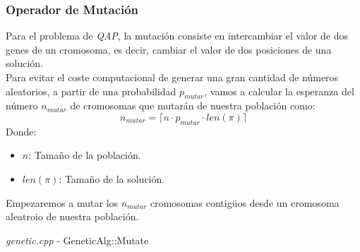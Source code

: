 \documentclass[a4paper, 12pt]{article}
\begin{document}
      \newpage
      \subsubsection*{Operador de Mutación}    
      Para el problema de \textit{QAP}, la mutación consiste en intercambiar el valor de dos genes de un cromosoma, es decir, cambiar el valor de dos posiciones de una solución.\\
      
      Para evitar el coste computacional de generar una gran cantidad de números aleatorios, a partir de una probabilidad $p_{mutar}$, vamos a calcular la esperanza del número $n_{mutar}$ de cromosomas que mutarán de nuestra población como:
      $$n_{mutar} = \lceil  n \cdot p_{mutar} \cdot len(\pi) \rceil$$
      Donde:
      \begin{itemize}
      	\item $n$: Tamaño de la población.
      	\item $len(\pi)$: Tamaño de la solución.
      \end{itemize}
      
      Empezaremos a mutar los $n_{mutar}$ cromosomas contigüos desde un cromosoma aleatroio de nuestra población.
      \begin{algorithm}
       	\caption{\textit{genetic.cpp} - GeneticAlg::Mutate}
       	
         \Def{Mutate($P$)}{
         	$P' = P$\\
         	$n_{mutar} = \lceil  n \cdot p_{mutar} \cdot len(P_0) \rceil$\\
         	$i = $ random in $[0, n)$\\
            \For{$j = 1$ \KwTo $n_{mutar}$}{
            	$r1 = $ random in $[0, len(P'_0))$\\
            	$r2 = $ random in $[0, len(P'_0))$\\
            	
            	\If{coste $P_i$ desconocido}{
            		Calcula coste $P_i$\\
            		evaluaciones++\\
            	}
            	
            	$\pi_o = P'_i$\\
            	$t = P'_i(r1)$\\
                $P'_i(r1) = P'_i(r2)$\\
                $P'_i(r2) = t$\\
                
                coste $P'_i(s) =$ coste $\pi_o + \Delta C(\pi_o,r1,r2)$\\
                evaluaciones++\\            	
            }         
            
            \textbf{return} $P'$\\
         }
      \end{algorithm}
      
\end{document}
